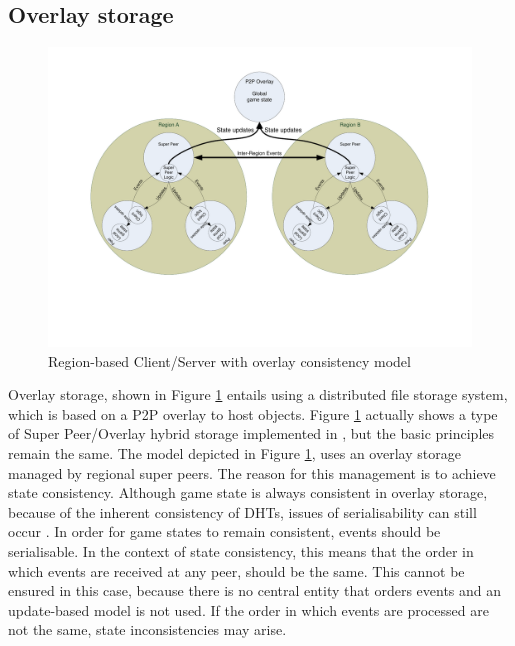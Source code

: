 \documentclass[10pt,a4paper,journal,cspaper,compsoc]{IEEEtran}
\begin{document}
\subsection{Overlay storage}
\label{overlay_storage}

\begin{figure}[htbp]
 \centering
 \includegraphics[clip=true, viewport=2cm 5cm 27cm 19.5cm, width=\textwidth]{region_based_CS_CM_P2PO}
 \caption{Region-based Client/Server with overlay consistency model}
 \label{fig_cs_region_o_cm}
\end{figure}
%
Overlay storage, shown in Figure \ref{fig_cs_region_o_cm} entails using a distributed file storage system, which is based on a P2P overlay to host
objects. Figure \ref{fig_cs_region_o_cm} actually shows a type of Super Peer/Overlay hybrid storage implemented in \cite{zoned_federation}, but the
basic principles remain the same. The model depicted in Figure \ref{fig_cs_region_o_cm}, uses an overlay storage managed by regional super peers. The
reason for this management is to achieve state consistency. Although game state is always consistent in overlay storage, because of the inherent
consistency of DHTs, issues of serialisability can still occur \cite{zoned_federation}. In order for game states to remain consistent, events should
be serialisable. In the context of state consistency, this means that the order in which events are received at any peer, should be the same. This
cannot be ensured in this case, because there is no central entity that orders events and an update-based model is not used. If the order in which
events are processed are not the same, state inconsistencies may arise.
\end{document}
